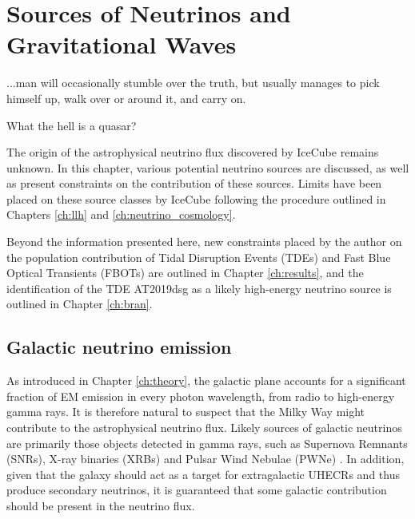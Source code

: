 \setchapterpreamble[u]{\margintoc}
\chapter{Sources of Neutrinos and Gravitational Waves}
\begin{fquote}...man will occasionally stumble over the truth, but usually manages to pick himself up, walk over or around it, and carry on. 
\end{fquote}

\begin{fquote} What the hell is a quasar?
\end{fquote}


The origin of the astrophysical neutrino flux discovered by IceCube remains unknown. In this chapter, various potential neutrino sources are discussed, as well as present constraints on the contribution of these sources. Limits have been placed on these source classes by IceCube following the procedure outlined in Chapters \ref{ch:llh} and \ref{ch:neutrino_cosmology}.

Beyond the information presented here, new constraints placed by the author on the population contribution of Tidal Disruption Events (TDEs) and Fast Blue Optical Transients (FBOTs) are outlined in Chapter \ref{ch:results}, and the identification of the TDE AT2019dsg as a likely high-energy neutrino source is outlined in Chapter \ref{ch:bran}.

\section{Galactic neutrino emission}

As introduced in Chapter \ref{ch:theory}, the galactic plane accounts for a significant fraction of EM emission in every photon wavelength, from radio to high-energy gamma rays. It is therefore natural to suspect that the Milky Way might contribute to the astrophysical neutrino flux. Likely sources of galactic neutrinos are primarily those objects detected in gamma rays, such as Supernova Remnants (SNRs), X-ray binaries (XRBs) and Pulsar Wind Nebulae (PWNe) . In addition, given that the galaxy should act as a target for extragalactic UHECRs and thus produce secondary neutrinos, it is guaranteed that some galactic contribution should be present in the neutrino flux. 

